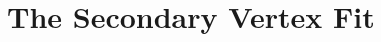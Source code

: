\ifx\master\undefined\fi

\chapter{The Secondary Vertex Fit}
\label{ch:svfit}

\ifx\master\undefined\fi
